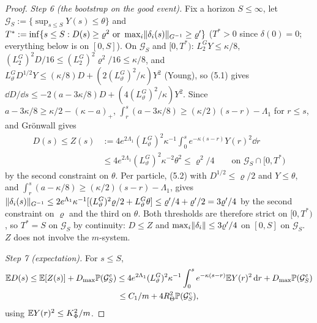 \begin{proof}
\smallskip
\emph{Step 6 (the bootstrap on the good event).} Fix a horizon $S\le\infty$, let
$\mathcal{G}_S := \{\sup_{s\le S}Y(s)\le\theta\}$ and
$T^* := \inf\{s\le S : D(s)\ge\varrho^2\text{ or }\max_i\lVert \delta_i(s)\rVert_{G^{-1}}\ge\varrho'\}$ ($T^* > 0$ since
$\delta(0) = 0$; everything below is on $[0,S]$). On $\mathcal{G}_S$ and $[0,T^*)$: $L_2^GY\le\kappa/8$,
$(L_2^G)^2D/16\le(L_2^G)^2\varrho^2/16\le\kappa/8$, and
$L_\vartheta^GD^{1/2}Y\le(\kappa/8)D + (2(L_\vartheta^G)^2/\kappa)Y^2$ (Young), so (5.1) gives
$\dd D/\dd s\le-2(a - 3\kappa/8)D + (4(L_\vartheta^G)^2/\kappa)Y^2$. Since
$a - 3\kappa/8\ge\kappa/2 - (\kappa - a)_+$, $\int_r^s(a - 3\kappa/8)\ge(\kappa/2)(s - r) - \Lambda_1$ for $r\le s$,
and Gr\"onwall gives
\begin{equation}
  \begin{split}
  D(s)\le Z(s) &:= 4e^{2\Lambda_1}(L_\vartheta^G)^2\kappa^{-1}\int_0^se^{-\kappa(s-r)}Y(r)^2\dd r\\
  &\le4e^{2\Lambda_1}(L_\vartheta^G)^2\kappa^{-2}\theta^2\le\varrho^2/4\qquad\text{on }\mathcal{G}_S\cap[0,T^*)
  \end{split}
  \tag{6.1}
\end{equation}
by the second constraint on $\theta$. Per particle, (5.2) with $D^{1/2}\le\varrho/2$ and $Y\le\theta$, and
$\int_r^s(a - \kappa/8)\ge(\kappa/2)(s - r) - \Lambda_1$, gives
$\lVert \delta_i(s)\rVert_{G^{-1}}\le2e^{\Lambda_1}\kappa^{-1}[(L_\vartheta^G)^2\varrho/2 + L_\vartheta^G\theta]
\le\varrho'/4 + \varrho'/2 = 3\varrho'/4$ by the second constraint on $\varrho$ and the third on $\theta$. Both
thresholds are therefore strict on $[0,T^*)$, so $T^* = S$ on $\mathcal{G}_S$ by continuity: $D\le Z$ and
$\max_i\lVert \delta_i\rVert\le3\varrho'/4$ on $[0,S]$ on $\mathcal{G}_S$. $Z$ does not involve the $m$-system.

\smallskip
\emph{Step 7 (expectation).} For $s\le S$,
\begin{multline*}
  \mathbb{E} D(s)\le\mathbb{E}[Z(s)] + D_{\max}\mathbb{P}(\mathcal{G}_S^c)
  \le4e^{2\Lambda_1}(L_\vartheta^G)^2\kappa^{-1}\int_0^se^{-\kappa(s-r)}\mathbb{E} Y(r)^2\,\mathrm{d} r + D_{\max}\mathbb{P}(\mathcal{G}_S^c)\\
  \le C_1/m + 4R_\Theta^2\mathbb{P}(\mathcal{G}_S^c),
\end{multline*}
using $\mathbb{E} Y(r)^2\le K_\Phi^2/m$.


\end{proof}
